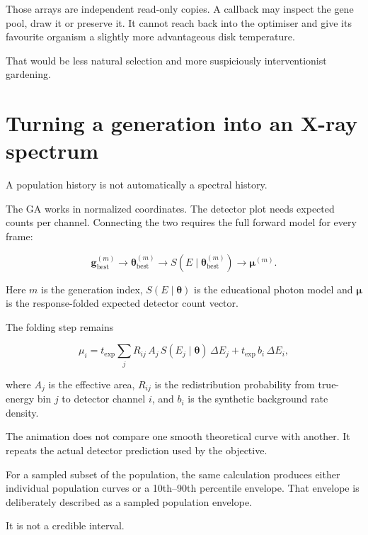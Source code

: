 \documentclass[11pt]{article}
\begin{document}
Those arrays are independent read-only copies. A callback may inspect the gene
pool, draw it or preserve it. It cannot reach back into the optimiser and give
its favourite organism a slightly more advantageous disk temperature.

That would be less natural selection and more suspiciously interventionist
gardening.

\section{Turning a generation into an X-ray spectrum}

A population history is not automatically a spectral history.

The GA works in normalized coordinates. The detector plot needs expected counts
per channel. Connecting the two requires the full forward model for every frame:

\begin{equation}
  \mathbf{g}^{(m)}_{\mathrm{best}}
  \longrightarrow
  \boldsymbol{\theta}^{(m)}_{\mathrm{best}}
  \longrightarrow
  S(E\mid\boldsymbol{\theta}^{(m)}_{\mathrm{best}})
  \longrightarrow
  \boldsymbol{\mu}^{(m)}.
\end{equation}

Here $m$ is the generation index, $S(E\mid\boldsymbol{\theta})$ is the
educational photon model and $\boldsymbol{\mu}$ is the response-folded expected
detector count vector.

The folding step remains

\begin{equation}
  \mu_i = t_{\mathrm{exp}}
  \sum_j R_{ij}\,A_j\,S(E_j\mid\boldsymbol{\theta})\,\Delta E_j
  + t_{\mathrm{exp}}\,b_i\,\Delta E_i,
\end{equation}

where $A_j$ is the effective area, $R_{ij}$ is the redistribution probability
from true-energy bin $j$ to detector channel $i$, and $b_i$ is the synthetic
background rate density.

The animation does not compare one smooth theoretical curve with another. It
repeats the actual detector prediction used by the objective.

For a sampled subset of the population, the same calculation produces either
individual population curves or a 10th--90th percentile envelope. That envelope
is deliberately described as a sampled population envelope.

It is not a credible interval.
\end{document}
